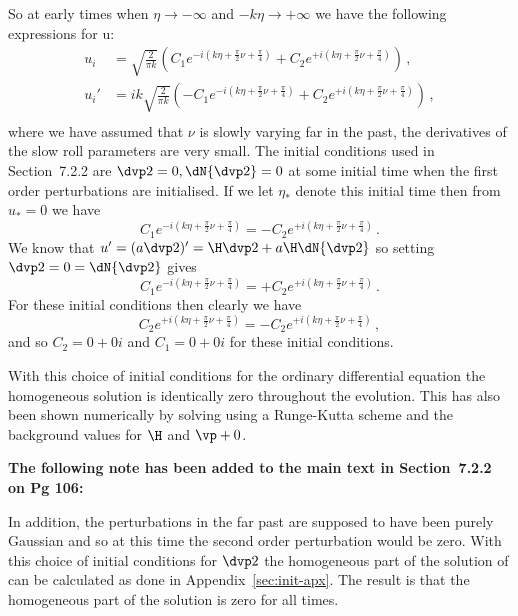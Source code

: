 So at early times when $\eta\rightarrow -\infty$ and $-k\eta\rightarrow +\infty$ we have the
following expressions for u:
% 
\begin{align}
 u_{i} &= \sqrt{\frac{2}{\pi k}}\left( C_1 e^{-i(k\eta +\frac{\pi}{2}\nu + \frac{\pi}{4})}
                + C_2 e^{+i(k\eta +\frac{\pi}{2}\nu + \frac{\pi}{4})} \right) \,,\\
 u_{i}' &= i k\sqrt{\frac{2}{\pi k}}\left( -C_1 e^{-i(k\eta +\frac{\pi}{2}\nu + \frac{\pi}{4})}
                + C_2 e^{+i(k\eta +\frac{\pi}{2}\nu + \frac{\pi}{4})} \right) \,,\\
\end{align}
% 
where we have assumed that $\nu$ is slowly varying far in the past, \iec the derivatives of the slow
roll parameters are very small. The initial conditions used in Section~7.2.2 are $\dvp2=0,
\dN{\dvp2}=0$ at some initial time when the first order perturbations are initialised. If we let
$\eta_*$ denote this initial time then from $u_*=0$ we have
% 
\begin{equation}
 C_1 e^{-i(k\eta +\frac{\pi}{2}\nu + \frac{\pi}{4})} = -C_2 e^{+i(k\eta +\frac{\pi}{2}\nu +
\frac{\pi}{4})}\,.
\end{equation}
% 
We know that $u'=(a\dvp2)' = \H \dvp2 + a\H \dN{\dvp2}$ so setting $\dvp2=0=\dN{\dvp2}$ gives
% 
\begin{equation}
 C_1 e^{-i(k\eta +\frac{\pi}{2}\nu + \frac{\pi}{4})} = +C_2 e^{+i(k\eta +\frac{\pi}{2}\nu +
\frac{\pi}{4})}\,.
\end{equation}
% 
For these initial conditions then clearly we have
% 
\begin{equation}
C_2 e^{+i(k\eta +\frac{\pi}{2}\nu + \frac{\pi}{4})} =
 -C_2 e^{+i(k\eta +\frac{\pi}{2}\nu + \frac{\pi}{4})} \,,
\end{equation}
% 
and so $C_2 = 0 + 0i$ and $C_1=0+0i$ for these initial conditions.

With this choice of initial conditions for the ordinary differential equation the homogeneous
solution is identically zero throughout the evolution. This has also been shown numerically by
solving  using a Runge-Kutta scheme and the background values for
$\H$ and $\vp+0$.


\textbf{The following note has been added to the main text in Section~7.2.2 on Pg 106:}

In addition, the perturbations in the far past are supposed to have been purely Gaussian and
so at this time the second order perturbation would be zero. 
With this choice of initial conditions for $\dvp2$ the homogeneous part of the solution of
 can be calculated as done in Appendix~\ref{sec:init-apx}. The result
is that the homogeneous part of the solution is zero for all times.

